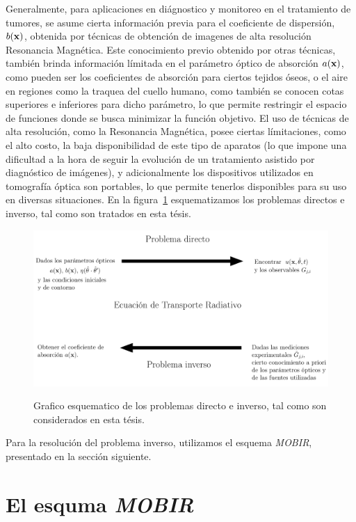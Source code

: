 Generalmente, para aplicaciones 
en diágnostico y monitoreo en el tratamiento de tumores, 
se asume cierta información previa 
para el coeficiente de dispersión, 
$b(\mathbf{x})$, obtenida por técnicas de obtención 
de imagenes de alta resolución~\cite{Althobaiti2017,Guven2003} \eg Resonancia Magnética. 
Este conocimiento previo obtenido por otras técnicas, también brinda 
información límitada en el parámetro óptico de absorción $a(\mathbf{x})$, 
como pueden ser los coeficientes de absorción para ciertos tejidos óseos, 
o el aire en regiones como la traquea del cuello humano, como también 
se conocen cotas superiores e inferiores para dicho parámetro, 
lo que permite restringir el espacio de funciones donde se busca minimizar 
la función objetivo. El uso de técnicas de alta resolución, como la Resonancia 
Magnética, posee ciertas límitaciones, como el alto costo, la baja disponibilidad 
de este tipo de aparatos 
(lo que impone una dificultad a la hora de seguir la evolución de un tratamiento 
asistido por diagnóstico de imágenes), y adicionalmente los dispositivos 
utilizados en tomografía óptica son portables, lo que permite tenerlos disponibles 
para su uso en diversas situaciones. En la figura~\ref{fig:esquemainv} esquematizamos los problemas directos e inverso, tal como son 
tratados en esta tésis. 


\begin{figure}[h!]
\centering
  \includegraphics[width=\linewidth]{figuras/inv.pdf}\\
  \caption{
Grafico esquematico de los problemas directo e inverso, tal como son considerados 
en esta tésis.}
 \label{fig:esquemainv}
\end{figure}
Para la resolución del problema inverso, utilizamos el esquema \textit{MOBIR}, 
presentado en la sección siguiente. 

\section{El esquma \textit{MOBIR}}

